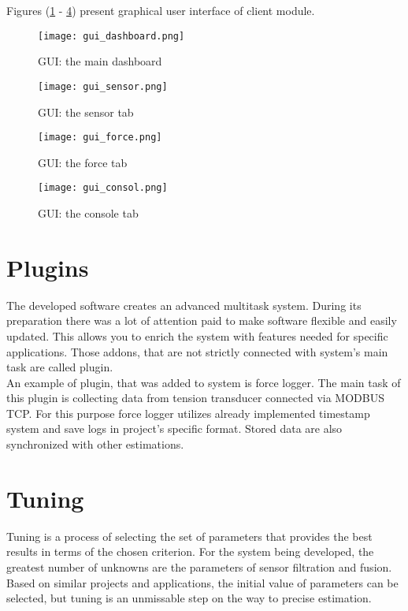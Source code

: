 Figures (\ref{gui1} - \ref{gui4}) present graphical user interface of client module.

\begin{figure}[!h]
	\centering
	\texttt{[image: gui\_dashboard.png]}
	\caption{GUI: the main dashboard}
	\label{gui1}
\end{figure}

\begin{figure}[!h]
	\centering
	\texttt{[image: gui\_sensor.png]}
	\caption{GUI: the sensor tab}
	\label{gui2}
\end{figure}

\begin{figure}[!h]
	\centering
	\texttt{[image: gui\_force.png]}
	\caption{GUI: the force tab}
	\label{gui3}
\end{figure}

\begin{figure}[!h]
	\centering
	\texttt{[image: gui\_consol.png]}
	\caption{GUI: the console tab}
	\label{gui4}
\end{figure}

\section{Plugins}

The developed software creates an advanced multitask system. During its preparation there was a lot of attention paid to make software flexible and easily updated. This allows you to enrich the system with features needed for specific applications. Those addons, that are not strictly connected with system's main task are called plugin.\\

An example of plugin, that was added to system is force logger. The main task of this plugin is collecting data from tension transducer connected via MODBUS TCP. For this purpose force logger utilizes already implemented timestamp system and save logs in project's specific format. Stored data are also synchronized with other estimations.

\section{Tuning}

Tuning is a process of selecting the set of parameters that provides the best results in terms of the chosen criterion. For the system being developed, the greatest number of unknowns are the parameters of sensor filtration and fusion. Based on similar projects and applications, the initial value of parameters can be selected, but tuning is an unmissable step on the way to precise estimation.\\

